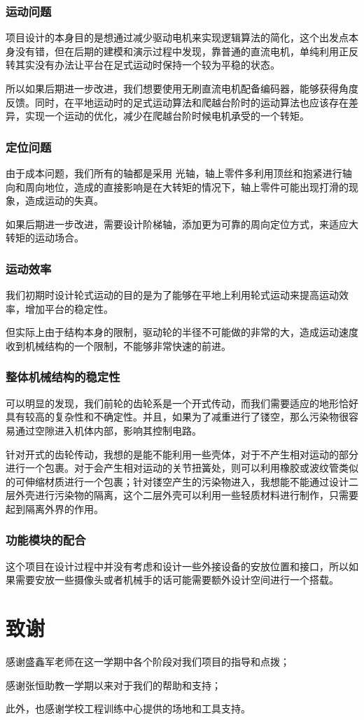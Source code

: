 \documentclass[12pt]{article}
\begin{document}
\begin{CJK}{UTF8}{song}
\subsubsection{运动问题}
项目设计的本身目的是想通过减少驱动电机来实现逻辑算法的简化，这个出发点本身没有错，但在后期的建模和演示过程中发现，靠普通的直流电机，单纯利用正反转其实没有办法让平台在足式运动时保持一个较为平稳的状态。\par
        所以如果后期进一步改进，我们想要使用无刷直流电机配备编码器，能够获得角度反馈。同时，在平地运动时的足式运动算法和爬越台阶时的运动算法也应该存在差异，实现一个运动的优化，减少在爬越台阶时候电机承受的一个转矩。

\subsubsection{定位问题}
由于成本问题，我们所有的轴都是采用 光轴，轴上零件多利用顶丝和抱紧进行轴向和周向地位，造成的直接影响是在大转矩的情况下，轴上零件可能出现打滑的现象，造成运动的失真。\par
如果后期进一步改进，需要设计阶梯轴，添加更为可靠的周向定位方式，来适应大转矩的运动场合。

\subsubsection{运动效率}
我们初期时设计轮式运动的目的是为了能够在平地上利用轮式运动来提高运动效率，增加平台的稳定性。\par
但实际上由于结构本身的限制，驱动轮的半径不可能做的非常的大，造成运动速度收到机械结构的一个限制，不能够非常快速的前进。

\subsubsection{整体机械结构的稳定性}
可以明显的发现，我们前轮的齿轮系是一个开式传动，而我们需要适应的地形恰好具有较高的复杂性和不确定性。并且，如果为了减重进行了镂空，那么污染物很容易通过空隙进入机体内部，影响其控制电路。\par
针对开式的齿轮传动，我想的是能不能利用一些壳体，对于不产生相对运动的部分进行一个包裹。对于会产生相对运动的关节扭簧处，则可以利用橡胶或波纹管类似的可伸缩材质进行一个包裹；针对镂空产生的污染物进入，我想能不能通过设计二层外壳进行污染物的隔离，这个二层外壳可以利用一些轻质材料进行制作，只需要起到隔离外界的作用。

\subsubsection{功能模块的配合}
 这个项目在设计过程中并没有考虑和设计一些外接设备的安放位置和接口，所以如果需要安放一些摄像头或者机械手的话可能需要额外设计空间进行一个搭载。
 \newpage
\section{致谢}
感谢盛鑫军老师在这一学期中各个阶段对我们项目的指导和点拨；\par
感谢张恒助教一学期以来对于我们的帮助和支持；\par
此外，也感谢学校工程训练中心提供的场地和工具支持。
\end{CJK}
\end{document}
